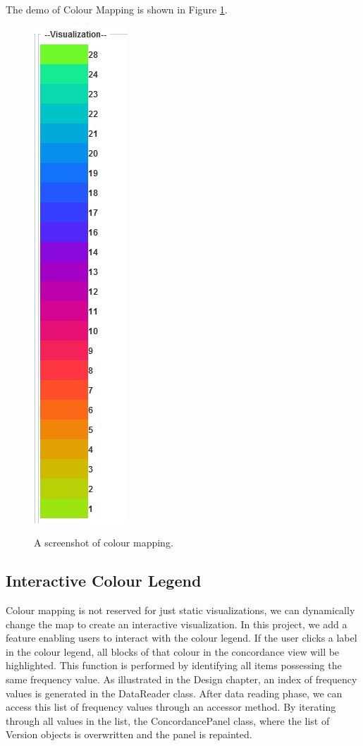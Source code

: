 The demo of Colour Mapping is shown in Figure \ref{fig:colourMapping}.
\begin{figure}[H]
	\centering	
	\includegraphics[scale=0.5]{Figs/Color-Mapping}\\[1ex]
	\caption{A screenshot of colour mapping.}
	\label{fig:colourMapping}
\end{figure} 

\subsection{Interactive Colour Legend}

Colour mapping is not reserved for just static visualizations, we can dynamically change the map to create an interactive visualization. In this project, we add a feature enabling users to interact with the colour legend. If the user clicks a label in the colour legend, all blocks of that colour in the concordance view will be highlighted. This function is performed by identifying all items possessing the same frequency value. As illustrated in the Design chapter, an index of frequency values is generated in the DataReader class. After data reading phase, we can access this list of frequency values through an accessor method. By iterating through all values in the list, the ConcordancePanel class, where the list of Version objects is overwritten and the panel is repainted.

